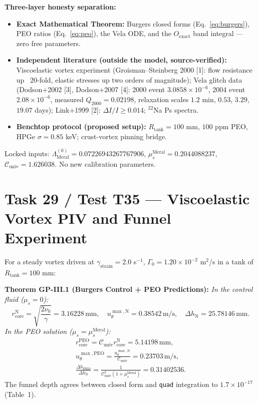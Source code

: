 \documentclass[12pt,a4paper]{article}
\begin{document}
\textbf{Three-layer honesty separation:}
\begin{itemize}
    \item \textbf{Exact Mathematical Theorem:} Burgers closed forms
    (Eq.~\ref{eq:burgers}), PEO ratios (Eq.~\ref{eq:peo}), the Vela ODE, and
    the $O_{\mathrm{exact}}$ band integral --- zero free parameters.
    \item \textbf{Independent literature (outside the model, source-verified):}
    Viscoelastic vortex experiment (Groisman--Steinberg 2000 [1]: flow
    resistance up ~20-fold, elastic stresses up two orders of magnitude);
    Vela glitch data (Dodson+2002 [3], Dodson+2007 [4]: 2000 event
    $3.0858\times10^{-6}$, 2004 event $2.08\times10^{-6}$, measured
    $Q_{2000}=0.02198$, relaxation scales $1.2$ min, $0.53$, $3.29$, $19.07$
    days); Link+1999 [2]: $\Delta I/I\ge 0.014$; $^{22}$Na Ps spectra.
    \item \textbf{Benchtop protocol (proposed setup):} $R_{\mathrm{tank}}=100$
    mm, $100$ ppm PEO, HPGe $\sigma=0.85$ keV; crust-vortex pinning bridge.
\end{itemize}
Locked inputs: $\Lambda_{\mathrm{Meral}}^{(0)} = 0.07226943267767906$,
$\mu_s^{\mathrm{Meral}} = 0.2044088237$,
$\mathcal{C}_{\mathrm{univ}} = 1.626038$. No new calibration parameters.

\section{Task 29 / Test T35 --- Viscoelastic Vortex PIV and Funnel Experiment}

For a steady vortex driven at $\gamma_{\mathrm{strain}}=2.0$ s$^{-1}$,
$\Gamma_0=1.20\times 10^{-2}$ m$^2$/s in a tank of $R_{\mathrm{tank}}=100$ mm:

\textbf{Theorem GP-III.1 (Burgers Control + PEO Predictions):} \textit{In the
control fluid ($\mu_s=0$):}
\begin{equation}
\label{eq:burgers}
\boxed{r_{\mathrm{core}}^{\mathrm{N}}=\sqrt{\frac{2\nu_0}{\gamma}}
=3.16228\,\mathrm{mm},\quad
u_\theta^{\max,\mathrm{N}}=0.38542\,\mathrm{m/s},\quad
\Delta h_{\mathrm{N}}=25.78146\,\mathrm{mm}.}
\end{equation}
\textit{In the PEO solution ($\mu_s=\mu_s^{\mathrm{Meral}}$):}
\begin{equation}
\label{eq:peo}
\begin{split}
\boxed{r_{\mathrm{core}}^{\mathrm{PEO}}=\mathcal{C}_{\mathrm{univ}}r_{\mathrm{core}}^{\mathrm{N}}
=5.14198\,\mathrm{mm},} \\
\boxed{u_\theta^{\max,\mathrm{PEO}}=\frac{u_\theta^{\max,\mathrm{N}}}{\mathcal{C}_{\mathrm{univ}}}
=0.23703\,\mathrm{m/s},} \\
\boxed{\frac{\Delta h_{\mathrm{PEO}}}{\Delta h_{\mathrm{N}}}
=\frac{1}{\mathcal{C}_{\mathrm{univ}}^2(1+\mu_s^{\mathrm{Meral}})}=0.31402536.}
\end{split}
\end{equation}
The funnel depth agrees between closed form and \texttt{quad} integration to
$1.7\times 10^{-17}$ (Table~1).
\end{document}
